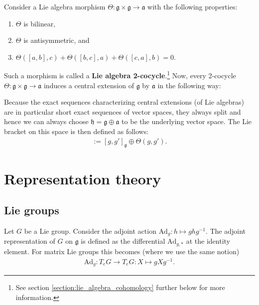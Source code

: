     \begin{construct}\label{lie:cocycle}
        Consider a Lie algebra morphism $\Theta:\mathfrak{g}\times\mathfrak{g}\rightarrow\mathfrak{a}$ with the following properties:
        \begin{enumerate}
            \item $\Theta$ is bilinear,
            \item $\Theta$ is antisymmetric, and
            \item $\Theta([a,b], c) + \Theta([b,c], a) + \Theta([c,a], b) = 0$.
        \end{enumerate}
        Such a morphism is called a \textbf{Lie algebra 2-cocycle}.\footnote{See section \ref{section:lie_algebra_cohomology} further below for more information.} Now, every 2-cocycle $\Theta:\mathfrak{g}\times\mathfrak{g}\rightarrow\mathfrak{a}$ induces a central extension of $\mathfrak{g}$ by $\mathfrak{a}$ in the following way:

        \qquad Because the exact sequences characterizing central extensions (of Lie algebras) are in particular short exact sequences of vector spaces, they always split and hence we can always choose $\mathfrak{h}=\mathfrak{g}\oplus\mathfrak{a}$ to be the underlying vector space. The Lie bracket on this space is then defined as follows:
        \begin{gather}
            [g\oplus\lambda,g'\oplus\mu] := [g,g']_{\mathfrak{g}} \oplus \Theta(g,g').
        \end{gather}
    \end{construct}

\section{Representation theory}
\subsection{Lie groups}


    \begin{example}\label{lie:adjoint_representation}
        Let $G$ be a Lie group. Consider the adjoint action $\text{Ad}_g:h\mapsto ghg^{-1}$. The adjoint representation of $G$ on $\mathfrak{g}$ is defined as the differential $\text{Ad}_{g,*}$ at the identity element. For matrix Lie groups this becomes (where we use the same notion)
        \begin{gather}
            \text{Ad}_g:T_eG\rightarrow T_eG:X\mapsto gXg^{-1}.
        \end{gather}
    \end{example}

